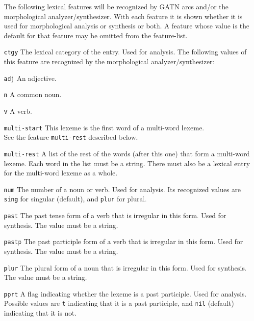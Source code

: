 \documentclass{book}
\begin{document}
The following lexical features will be recognized by GATN arcs and/or the morphological
an\-a\-lyz\-er/syn\-the\-siz\-er.  With each feature it is shown whether it is used for
morphological analysis or synthesis or both.  A feature whose value is the default for that feature
may be omitted from the feature-list.
\begin{description}
\item{\tt ctgy} The lexical category of the entry.  Used for analysis.  The
following values of this feature are recognized by the morphological analyzer/synthesizer:
\begin{description}
\item{\tt adj} An adjective.
\item{\tt n} A common noun.
\item{\tt v} A verb.
\item{\tt multi-start} This lexeme is the first word of a multi-word lexeme.\\
See the feature {\tt multi-rest} described below.
\end{description}

\item{\tt multi-rest} A list of the rest of the words (after this one) that
form a multi-word lexeme.  Each word in the list must be a string.  There must
also be a lexical entry for the multi-word lexeme as a whole.

\item{\tt num} The number of a noun or verb.  Used for analysis.  Its recognized values are {\tt
sing} for singular (default), and {\tt plur} for plural.

\item{\tt past} The past tense form of a verb that is irregular in this form.  Used for
synthesis.  The value must be a string.

\item{\tt pastp} The past participle form of a verb that is irregular in this form.  Used for
synthesis.  The value must be a string.

\item{\tt plur} The plural form of a noun that is irregular in this form.  Used for
synthesis.  The value must be a string.

\item{\tt pprt} A flag indicating whether the lexeme is a past participle.  Used for
analysis.  Possible values are {\tt t} indicating that it is a past participle, and
{\tt nil} (default) indicating that it is not.


\end{description}
\end{document}
